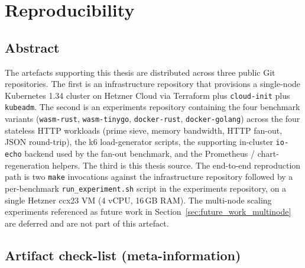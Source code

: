 \chapter{Reproducibility}
\label{app:reproducibility}

\section{Abstract}

\begin{sloppypar}
The artefacts supporting this thesis are distributed across three public Git repositories. The first is an infrastructure repository that provisions a single-node Kubernetes 1.34 cluster on Hetzner Cloud via Terraform plus \texttt{cloud-init} plus \texttt{kubeadm}. The second is an experiments repository containing the four benchmark variants (\texttt{wasm-rust}, \texttt{wasm-tinygo}, \texttt{docker-rust}, \texttt{docker-golang}) across the four stateless \acs{HTTP} workloads (prime sieve, memory bandwidth, HTTP fan-out, JSON round-trip), the k6 load-generator scripts, the supporting in-cluster \texttt{io-echo} backend used by the fan-out benchmark, and the Prometheus / chart-regeneration helpers. The third is this thesis source. The end-to-end reproduction path is two \texttt{make} invocations against the infrastructure repository followed by a per-benchmark \texttt{run\_experiment.sh} script in the experiments repository, on a single Hetzner ccx23 \acs{VM} (4 vCPU, 16\,GB \acs{RAM}). The multi-node scaling experiments referenced as future work in Section~\ref{sec:future_work_multinode} are deferred and are not part of this artefact.
\end{sloppypar}

\section{Artifact check-list (meta-information)}

